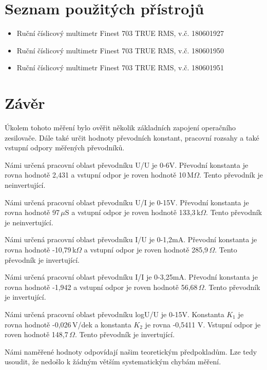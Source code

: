 \documentclass[a4paper, czech]{article}
\begin{document}
\section{Seznam použitých přístrojů}

\begin{itemize}
    \item Ruční číslicový multimetr Finest 703 TRUE RMS, v.č. 180601927
    \item Ruční číslicový multimetr Finest 703 TRUE RMS, v.č. 180601950
    \item Ruční číslicový multimetr Finest 703 TRUE RMS, v.č. 180601951
\end{itemize}

\section{Závěr}

Úkolem tohoto měření bylo ověřit několik základních zapojení operačního zesilovače. Dále také určit hodnoty převodních konstant, pracovní rozsahy a také vstupní odpory měřených převodníků.

Námi určená pracovní oblast převodníku U/U je 0-6V. Převodní konstanta je rovna hodnotě 2,431 a vstupní odpor je roven hodnotě 10\,M$\Omega$. Tento převodník je neinvertující.

Námi určená pracovní oblast převodníku U/I je 0-15V. Převodní konstanta je rovna hodnotě 97\,$\mu$S a vstupní odpor je roven hodnotě 133,3\,k$\Omega$. Tento převodník je neinvertující.

Námi určená pracovní oblast převodníku I/U je 0-1,2mA. Převodní konstanta je rovna hodnotě -10,79\,k$\Omega$ a vstupní odpor je roven hodnotě 285,9\,$\Omega$. Tento převodník je invertující.

Námi určená pracovní oblast převodníku I/I je 0-3,25mA. Převodní konstanta je rovna hodnotě -1,942 a vstupní odpor je roven hodnotě 56,68\,$\Omega$. Tento převodník je invertující.

Námi určená pracovní oblast převodníku logU/U je 0-15V. Konstanta $K_1$ je rovna hodnotě -0,026\,V/dek a konstanta $K_2$ je rovna -0,5411 V. Vstupní odpor je roven hodnotě 148,7\,$\Omega$. Tento převodník je invertující.

Námi naměřené hodnoty odpovídají našim teoretickým předpokladům. Lze tedy usoudit, že nedošlo k žádným větším systematickým chybám měření.
\end{document}
